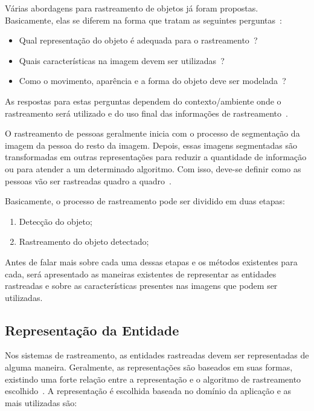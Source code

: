 	Várias abordagens para rastreamento de objetos já foram propostas. Basicamente, elas se diferem na forma que tratam as seguintes perguntas~\cite{yilmaz}: 
		
		\begin{itemize}
			\item Qual representação do objeto é adequada para o rastreamento~\cite{yilmaz}?
			\item Quais características na imagem devem ser utilizadas~\cite{yilmaz}?
			\item Como o movimento, aparência e a forma do objeto deve ser modelada~\cite{yilmaz}? 
		\end{itemize}

	As respostas para estas perguntas dependem do contexto/ambiente onde o rastreamento será utilizado e do uso final das informações de rastreamento~\cite{yilmaz}.

	O rastreamento de pessoas geralmente inicia com o processo de segmentação da
	imagem da pessoa do resto da imagem. Depois, essas imagens segmentadas são
	transformadas em outras representações para reduzir a quantidade de informação
	ou para atender a um determinado algoritmo. Com isso, deve-se definir como as
	pessoas vão ser rastreadas quadro a quadro~\cite{moeslund}.

	Basicamente, o processo de rastreamento pode ser dividido em duas etapas:

		\begin{enumerate}
			\item Detecção do objeto;
			\item Rastreamento do objeto detectado;
		\end{enumerate}

	Antes de falar mais sobre cada uma dessas etapas e os métodos existentes para cada, será apresentado as maneiras existentes de representar as entidades rastreadas e sobre as características presentes nas imagens que podem ser utilizadas.


\subsection{Representação da Entidade}
\label{sec:representacao-objeto}

	Nos sistemas de rastreamento, as entidades rastreadas devem ser representadas de alguma maneira. Geralmente, as representações são baseados em suas formas, existindo uma forte relação entre a representação e o algoritmo de rastreamento escolhido~\cite{yilmaz}. A representação é escolhida baseada no domínio da aplicação e as mais utilizadas são:

